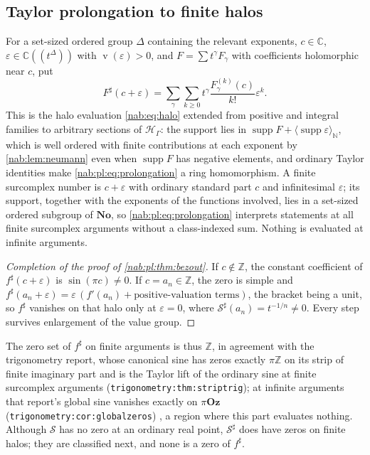 \documentclass[11pt,letterpaper]{article}
\theoremstyle{definition}
\theoremstyle{remark}
\newcommand{\C}{\mathbb C}
\newcommand{\Z}{\mathbb Z}
\newcommand{\N}{\mathbb N}
\newcommand{\No}{\mathbf{No}}
\newcommand{\HH}{\mathscr H_\Gamma}
\newcommand{\supp}{\operatorname{supp}}
\newcommand{\val}{\operatorname{v}}
\newcommand{\angles}[1]{\langle #1\rangle_{\N}}
\newcommand{\Oz}{\mathbf{Oz}}
\numberwithin{equation}{section}
\begin{document}
\subsection{Taylor prolongation to finite halos}\label{nab:pl:sub:prolongation}

For a set-sized ordered group $\Delta$ containing the relevant exponents,
$c\in\C$, $\varepsilon\in\C((t^\Delta))$ with $\val(\varepsilon)>0$, and
$F=\sum t^\gamma F_\gamma$ with coefficients holomorphic near $c$, put
\begin{equation}\label{nab:pl:eq:prolongation}
 F^\sharp(c+\varepsilon)=\sum_\gamma\sum_{k\geq0}
 t^\gamma\frac{F_\gamma^{(k)}(c)}{k!}\varepsilon^k .
\end{equation}
This is the halo evaluation \eqref{nab:eq:halo} extended from positive and
integral families to arbitrary sections of $\HH$: the support lies in
$\supp F+\angles{\supp\varepsilon}$, which is well ordered with finite
contributions at each exponent by \cref{nab:lem:neumann} even when $\supp F$
has negative elements, and ordinary Taylor identities make
\eqref{nab:pl:eq:prolongation} a ring homomorphism. A finite surcomplex number
is $c+\varepsilon$ with ordinary standard part $c$ and infinitesimal
$\varepsilon$; its support, together with the exponents of the functions
involved, lies in a set-sized ordered subgroup of $\No$, so
\eqref{nab:pl:eq:prolongation} interprets statements at all finite surcomplex
arguments without a class-indexed sum. Nothing is evaluated at infinite
arguments.

\begin{proof}[Completion of the proof of \cref{nab:pl:thm:bezout}]
If $c\notin\Z$, the constant coefficient of $f^\sharp(c+\varepsilon)$ is
$\sin(\pi c)\neq0$. If $c=a_n\in\Z$, the zero is simple and
$f^\sharp(a_n+\varepsilon)=\varepsilon\,(f'(a_n)+\text{positive-valuation
terms})$, the bracket being a unit, so $f^\sharp$ vanishes on that halo only at
$\varepsilon=0$, where $\mathcal S^\sharp(a_n)=t^{-1/n}\neq0$. Every step
survives enlargement of the value group.
\end{proof}

The zero set of $f^\sharp$ on finite arguments is thus $\Z$, in agreement with
the trigonometry report, whose canonical sine has zeros exactly $\pi\Z$ on its
strip of finite imaginary part and is the Taylor lift of the ordinary sine at
finite surcomplex arguments (\nolinkurl{trigonometry:thm:striptrig}); at infinite
arguments that report's global sine vanishes exactly on $\pi\Oz$
(\nolinkurl{trigonometry:cor:globalzeros}) \cite{RepoTrig}, a region where this
part evaluates nothing. Although $\mathcal S$ has no zero at an ordinary real
point, $\mathcal S^\sharp$ does have zeros on finite halos; they are classified
next, and none is a zero of $f^\sharp$.
\end{document}
